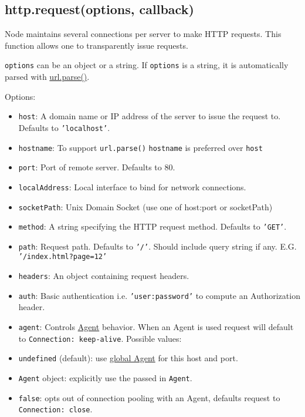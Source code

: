 \subsection{http.request(options, callback)}

Node maintains several connections per server to make HTTP requests.
This function allows one to transparently issue requests.

\texttt{options} can be an object or a string. If \texttt{options} is a
string, it is automatically parsed with
\href{url.html\#url\_url\_parse\_urlstr\_parsequerystring\_slashesdenotehost}{url.parse()}.

Options:

\begin{itemize}
\item
  \texttt{host}: A domain name or IP address of the server to issue the
  request to. Defaults to \texttt{'localhost'}.
\item
  \texttt{hostname}: To support \texttt{url.parse()} \texttt{hostname}
  is preferred over \texttt{host}
\item
  \texttt{port}: Port of remote server. Defaults to 80.
\item
  \texttt{localAddress}: Local interface to bind for network
  connections.
\item
  \texttt{socketPath}: Unix Domain Socket (use one of host:port or
  socketPath)
\item
  \texttt{method}: A string specifying the HTTP request method. Defaults
  to \texttt{'GET'}.
\item
  \texttt{path}: Request path. Defaults to \texttt{'/'}. Should include
  query string if any. E.G. \texttt{'/index.html?page=12'}
\item
  \texttt{headers}: An object containing request headers.
\item
  \texttt{auth}: Basic authentication i.e. \texttt{'user:password'} to
  compute an Authorization header.
\item
  \texttt{agent}: Controls \hyperref[http\_class\_http\_agent]{Agent}
  behavior. When an Agent is used request will default to
  \texttt{Connection: keep-alive}. Possible values:
\item
  \texttt{undefined} (default): use
  \hyperref[http\_http\_globalagent]{global Agent} for this host and
  port.
\item
  \texttt{Agent} object: explicitly use the passed in \texttt{Agent}.
\item
  \texttt{false}: opts out of connection pooling with an Agent, defaults
  request to \texttt{Connection: close}.
\end{itemize}

